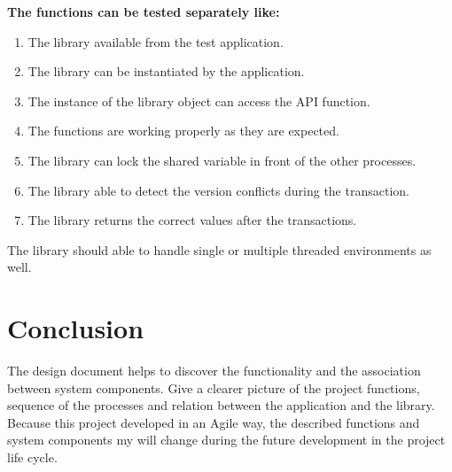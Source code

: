 \documentclass[12pt]{article}
\begin{document}
\textbf{The functions can be tested separately like:}
\begin{enumerate}
\item The library available from the test application.
\item The library can be instantiated by the application.
\item The instance of the library object can access the API function.
\item The functions are working properly as they are expected.
\item The library can lock the shared variable in front of the other processes.
\item The library able to detect the version conflicts during the transaction.
\item The library returns the correct values after the transactions.
\end{enumerate}


The library should able to handle single or multiple threaded environments as well.



\section{Conclusion}
The design document helps to discover the functionality and the association between system components. Give a clearer picture of the project functions, sequence of the processes and relation between the application and the library.\\

Because this project developed in an Agile way, the described functions and system components my will change during the future development in the project life cycle.
\end{document}
